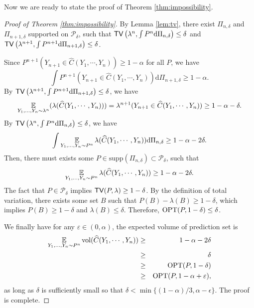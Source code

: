 Now we are ready to state the proof of Theorem \ref{thm:impossibility}.
\begin{proof}[Proof of Theorem \ref{thm:impossibility}]
By Lemma \ref{lem:tv}, there exist $\Pi_{n,\delta}$ and $\Pi_{n+1,\delta}$ supported on $\mathcal{P}_{\delta}$, such that ${\sf TV}\left(\lambda^n, \int P^n \mathrm{d}\Pi_{n,\delta}\right)\leq\delta$ and ${\sf TV}\left(\lambda^{n+1}, \int P^{n+1} \mathrm{d}\Pi_{n+1,\delta}\right)\leq\delta$. 

Since $P^{n+1}(Y_{n+1}\in \widehat{C}(Y_1,\cdots,Y_n))\geq 1-\alpha$ for all $P$, we have
$$\int P^{n+1}(Y_{n+1}\in \widehat{C}(Y_1,\cdots,Y_n))\mathrm{d}\Pi_{n+1,\delta}\geq 1-\alpha.$$
By ${\sf TV}\left(\lambda^{n+1}, \int P^{n+1} \mathrm{d}\Pi_{n+1,\delta}\right)\leq\delta$, we have
\begin{align*}
    \operatorname*{\mathbb{E}}_{Y_1,\dots,Y_n \sim \lambda^n}(\lambda(\widehat{C}(Y_1,\cdots,Y_n)))
    =\lambda^{n+1}(Y_{n+1}\in \widehat{C}(Y_1,\cdots,Y_n))\geq 1-\alpha-\delta.
\end{align*}
By ${\sf TV}\left(\lambda^n, \int P^n \mathrm{d}\Pi_{n,\delta}\right)\leq\delta$, we have
$$\int \operatorname*{\mathbb{E}}_{Y_1,\dots,Y_n \sim P^n}\lambda(\widehat{C}(Y_1,\cdots,Y_n)) \mathrm{d}\Pi_{n,\delta}\geq 1-\alpha-2\delta.$$
Then, there must exists some $P\in\text{supp}(\Pi_{n,\delta})\subset\mathcal{P}_{\delta}$, such that
$$\operatorname*{\mathbb{E}}_{Y_1,\dots,Y_n \sim P^n}\lambda(\widehat{C}(Y_1,\cdots,Y_n))\geq 1-\alpha-2\delta.$$
The fact that $P\in \mathcal{P}_{\delta}$ implies ${\sf TV}(P,\lambda)\geq 1-\delta$. 
By the definition of total variation, there exists some set $B$ such that $P(B)-\lambda(B)\geq 1-\delta$, which implies $P(B)\geq 1-\delta$ and $\lambda(B)\leq\delta$. Therefore, $\operatorname{OPT}(P,1-\delta)\leq \delta$. 

We finally have for any $\varepsilon \in (0,\alpha)$, the expected volume of prediction set is
\begin{eqnarray*}
\operatorname*{\mathbb{E}}_{Y_1,\dots,Y_n \sim P^n}\mathrm{vol}(\widehat{C}(Y_1,\cdots,Y_n)) 
&\geq& 1-\alpha-2\delta \\
&\geq& \delta \\
&\geq& \operatorname{OPT}(P,1-\delta) \\
&\geq& \operatorname{OPT}(P,1-\alpha + \varepsilon),
\end{eqnarray*}
as long as $\delta$ is sufficiently small so that $\delta<\min\{(1-\alpha)/3, \alpha-\epsilon\}$. The proof is complete.
\end{proof}


